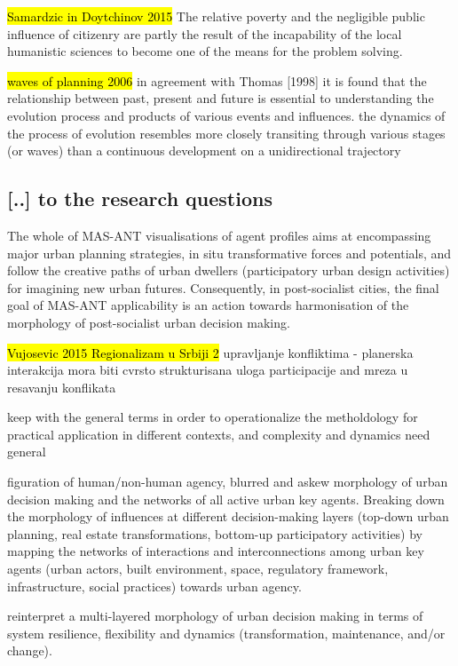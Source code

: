 \documentclass[11pt]{report}
\begin{document}
\hl{Samardzic in Doytchinov 2015} 
The relative poverty and the negligible public influence of citizenry are partly the result of the incapability of the local
humanistic  sciences  to  become  one  of  the  means  for  the  problem  solving. 

\hl{waves of planning 2006}
in  agreement  with  Thomas [1998] it is found that the relationship between past, present and future is essential to understanding  the  evolution  process  and  products  of  various  events  and  influences.
the dynamics of the process  of  evolution  resembles  more  closely  transiting  through  various  stages  (or  waves)
than a continuous development on a unidirectional trajectory

\subsection{[..] to the research questions}

The whole of MAS-ANT visualisations of agent profiles aims at encompassing major urban planning strategies, in situ transformative forces and potentials, and follow the creative paths of urban dwellers (participatory urban design activities) for imagining new urban futures. Consequently, in post-socialist cities, the final goal of MAS-ANT applicability is an action towards harmonisation of the morphology of post-socialist urban decision making.

\hl{Vujosevic 2015 Regionalizam u Srbiji 2}
upravljanje konfliktima - planerska interakcija mora biti cvrsto strukturisana
uloga participacije and mreza u resavanju konflikata

keep with the general terms in order to operationalize the metholdology for practical application in different contexts, and complexity and dynamics need general

figuration of human/non-human agency, blurred and askew morphology of urban decision making and the networks of all active urban key agents.
Breaking  down  the morphology of influences at different decision-making layers (top-down urban planning, real estate transformations, bottom-up participatory activities) by mapping the networks of interactions and interconnections among urban key agents (urban actors, built environment, space, regulatory framework, infrastructure, social practices) towards urban agency.

reinterpret a multi-layered morphology of urban decision making in terms of system resilience, flexibility and dynamics (transformation, maintenance, and/or change).
\end{document}
